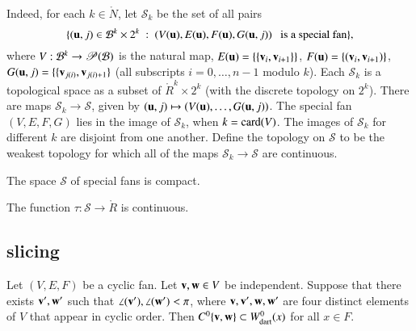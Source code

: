 Indeed, for each $k\in\ring{N}$,  let ${\mathcal S}_k$ be the set of all pairs 
$$\{({\mathbf u},j) \in{\mathcal B}^k\times 2^k \ :\  (V({\mathbf u}),E({\mathbf u}),F({\mathbf u}),G({\mathbf u},j)) \text{~~ is a special fan}\},$$
where $V:{\mathcal B}^k\to {\mathscr P}({\mathcal B})$ is the natural map, $E({\mathbf u}) = \{\{{\mathbf v}_i,{\mathbf v}_{i+1}\}\}$,
$F({\mathbf u}) = \{({\mathbf v}_i,{\mathbf v}_{i+1})\}$, $G({\mathbf u},j) = \{\{{\mathbf v}_{j(i)},{\mathbf v}_{j(i)+1}\}$ (all subscripts $i=0,\ldots,n-1$ modulo $k$).  Each ${\mathcal S}_k$ is
a topological space as a subset of $\ring{R}^k\times 2^k$ (with the discrete topology on $2^k$).  There are maps ${\mathcal S}_k\to{\mathcal S}$, given by
$({\mathbf u},j)\mapsto (V({\mathbf u}),\ldots,G({\mathbf u},j))$.
The special fan $(V,E,F,G)$ lies in the image of ${\mathcal S}_k$, when
$k = {\operatorname{card}}(V)$.  The images of ${\mathcal S}_k$ for different $k$ are disjoint
from one another.  Define the topology on ${\mathcal S}$ to be the weakest topology for which all of the maps ${\mathcal S}_k\to {\mathcal S}$ are
continuous.


\begin{lemma}
The space ${\mathcal S}$ of special fans is compact.
\end{lemma}



\begin{lemma}
The function $\tau:{\mathcal S}\to \ring{R}$ is continuous.
\end{lemma}



\subsection{slicing}


\begin{lemma}  
Let $(V,E,F)$ be a cyclic fan. 
Let ${\mathbf v},{\mathbf w}\in V$ be independent.  Suppose that there exists ${\mathbf v}',{\mathbf w}'$ such
that $\angle({\mathbf v}'),\angle({\mathbf w}')<\pi$, where ${\mathbf v},{\mathbf v}',{\mathbf w},{\mathbf w}'$ are four distinct elements of
$V$ that appear in cyclic order.
Then $C^0\{{\mathbf v},{\mathbf w}\}\subset W^0_{\text{dart}}(x)$ for all $x\in F$.
\end{lemma}
%
%
%

